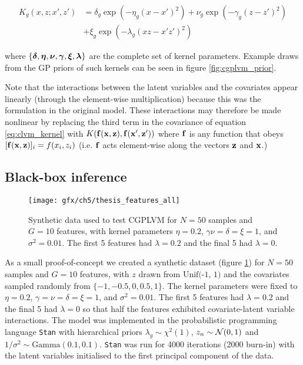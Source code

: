 \begin{equation}
  \begin{aligned}
  K_g(x, z; x', z') & =
  \delta_g \exp(-\eta_g (x - x')^2) +
  \nu_g \exp(-\gamma_g(z - z')^2) \\
  & + \xi_g \exp(-\lambda_g(xz - x'z')^2)
\end{aligned}
\end{equation}

where $\{\bm{\delta}, \bm{\eta}, \bm{\nu}, \bm{\gamma}, \bm{\xi}, \bm{\lambda}\}$ are the complete set of kernel parameters. Example draws from the GP priors of such kernels can be seen in figure \ref{fig:cgplvm_prior}.


Note that the interactions between the latent variables and the covariates appear linearly (through the element-wise multiplication) because this was the formulation in the original model. These interactions may therefore be made nonlinear by replacing the third term in the covariance of equation \ref{eq:clvm_kernel} with $K(\mathbf{f}(\mathbf{x}, \mathbf{z}), \mathbf{f}(\mathbf{x}', \mathbf{z}'))$ where $\mathbf{f}$ is any function that obeys $[\mathbf{f}(\mathbf{x}, \mathbf{z})]_i = f(x_i, z_i)$ (i.e. $\mathbf{f}$ acts element-wise along the vectors $\mathbf{z}$ and $\mathbf{x}$.)



\subsection{Black-box inference}


\begin{figure}
  \centering
\texttt{[image: gfx/ch5/thesis\_features\_all]}
\caption{Synthetic data used to test CGPLVM for $N=50$ samples and $G=10$ features, with kernel parameters $\eta = 0.2$, $\gamma \nu = \delta = \xi = 1$, and $\sigma^2 = 0.01$. The first 5 features had $\lambda = 0.2$ and the final 5 had $\lambda = 0$.} \label{fig:cgplvm_data}
\end{figure}

As a small proof-of-concept we created a synthetic dataset (figure \ref{fig:cgplvm_data}) for $N=50$ samples and $G=10$ features, with $z$ drawn from $\text{Unif(-1, 1)}$ and the covariates sampled randomly from $\{-1, -0.5, 0, 0.5, 1\}$. The kernel parameters were fixed to $\eta = 0.2$, $\gamma = \nu = \delta = \xi = 1$, and $\sigma^2 = 0.01$. The first 5 features had $\lambda = 0.2$ and the final 5 had $\lambda = 0$ so that half the features exhibited covariate-latent variable interactions. The model was implemented in the probabilistic programming language \texttt{Stan} with hierarchical priors $\lambda_g \sim \chi^2(1)$, $z_n \sim \mathcal{N}(0,1)$ and $1 / \sigma^2 \sim \text{Gamma}(0.1, 0.1)$.
\texttt{Stan} was run for 4000 iterations (2000 burn-in) with the latent variables initialised to the first principal component of the data.



